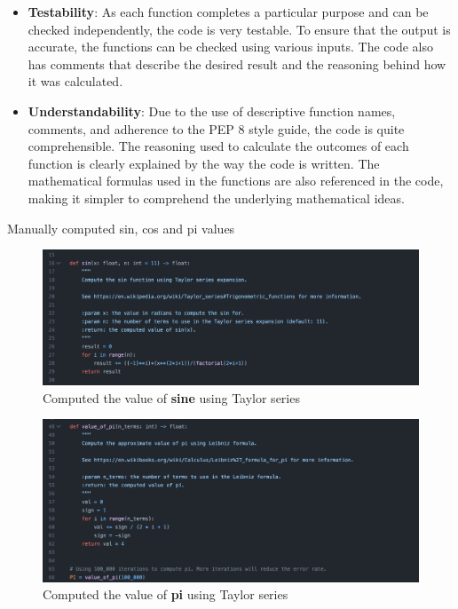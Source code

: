 \begin{itemize}
     \item \textbf{Testability}: As each function completes a particular purpose and can be checked independently, the code is very testable. To ensure that the output is accurate, the functions can be checked using various inputs. The code also has comments that describe the desired result and the reasoning behind how it was calculated.

     \item \textbf{Understandability}: Due to the use of descriptive function names, comments, and adherence to the PEP 8 style guide, the code is quite comprehensible. The reasoning used  to calculate the outcomes of each function is clearly explained by the way the code is written. The mathematical formulas used in the functions are also referenced in the code, making it simpler to comprehend the underlying mathematical ideas.

    
\end{itemize}
\newpage

Manually computed sin, cos and pi values 
\begin{figure}[h]
    \centering
    \includegraphics[width=13cm]{images/sin.png}
    \caption{Computed the value of \textbf{sine} using Taylor series}
    \label{fig:sin}
\end{figure}
\begin{figure}[h]
    \centering
    \includegraphics[width=13cm]{images/pi.png}
    \caption{Computed the value of \textbf{pi} using Taylor series}
    \label{fig:pi}
\end{figure}

